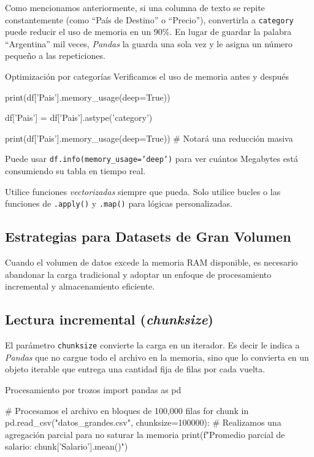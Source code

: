 Como mencionamos anteriormente, si una columna de texto se repite constantemente (como ``País de Destino'' o ``Precio''), convertirla a \texttt{category} puede reducir el uso de memoria en un 90\%. En lugar de guardar la palabra ``Argentina'' mil veces, \textit{Pandas} la guarda una sola vez y le asigna un número pequeño a las repeticiones.

\begin{pycode}{Optimización por categorías}
Verificamos el uso de memoria antes y después

print(df['Pais'].memory_usage(deep=True))

df['Pais'] = df['Pais'].astype('category')

print(df['Pais'].memory_usage(deep=True)) # Notará una reducción masiva
\end{pycode}

\begin{nota}
Puede usar \texttt{df.info(memory\_usage='deep')} para ver cuántos Megabytes está consumiendo su tabla en tiempo real.
\end{nota}


Utilice funciones \textit{vectorizadas} siempre que pueda. Solo utilice bucles o las funciones de \texttt{.apply()} y \texttt{.map()} para lógicas personalizadas.




\subsection{Estrategias para Datasets de Gran Volumen}

Cuando el volumen de datos excede la memoria RAM disponible, es necesario abandonar la carga tradicional y adoptar un enfoque de procesamiento incremental y almacenamiento eficiente.

\subsection{Lectura incremental (\textit{chunksize})}

El parámetro \texttt{chunksize} convierte la carga en un iterador. Es decir le indica a \textit{Pandas} que no cargue todo el archivo en la memoria, sino que lo convierta en un objeto iterable que entrega una cantidad fija de filas por cada vuelta.

\begin{pycode}{Procesamiento por trozos}
import pandas as pd

# Procesamos el archivo en bloques de 100,000 filas
for chunk in pd.read_csv("datos_grandes.csv", chunksize=100000):
    # Realizamos una agregación parcial para no saturar la memoria
    print(f"Promedio parcial de salario: {chunk['Salario'].mean()}")
\end{pycode}

